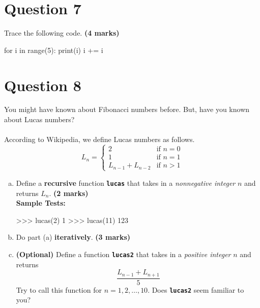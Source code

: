 \section{Question 7}
Trace the following code. \textbf{(4 marks)}
\begin{python}
for i in range(5):
    print(i)
    i += i
\end{python}

\section{Question 8}
You might have known about Fibonacci numbers before. But, have you known about Lucas numbers? \\ \\
According to Wikipedia, we define Lucas numbers as follows.
\[
    L_n =
    \begin{cases}
        2 & \text{if } n = 0 \\
        1 & \text{if } n = 1 \\
        L_{n-1} + L_{n-2} & \text{if } n > 1
    \end{cases}
\]
\begin{enumerate}[(a)]
\item Define a \textbf{recursive} function \texttt{\bfseries lucas} that takes in a \textit{nonnegative integer} $n$ and
returns $L_n$. \textbf{(2 marks)} \\
\textbf{Sample Tests:}
\begin{python}
>>> lucas(2)
1
>>> lucas(11)
123
\end{python}

\item Do part (a) \textbf{iteratively}. \textbf{(3 marks)}

\item \textbf{(Optional)} Define a function \texttt{\bfseries lucas2} that takes in a \textit{positive integer} $n$ and returns
\[\frac{L_{n-1}+L_{n+1}}{5}\]
Try to call this function for $n = 1, 2, \ldots, 10$. Does \texttt{\bfseries lucas2} seem familiar to you?
\end{enumerate}

